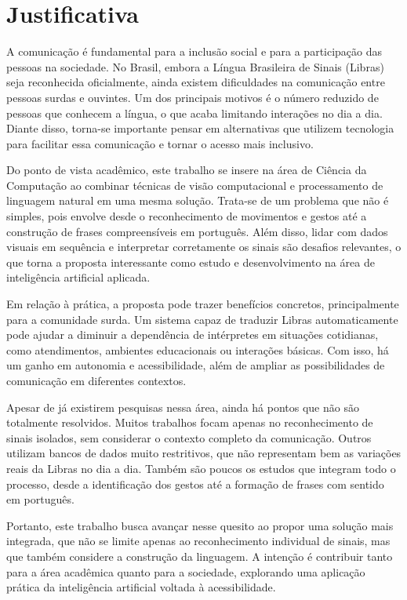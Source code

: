 \documentclass[
    12pt,                %
    openright,           %
    oneside,             %
    a4paper,             %
    english,             %
    brazil               %
]{abntex2}
\begin{document}
\section{Justificativa}
\label{sec:justificativa}

A comunicação é fundamental para a inclusão social e para a participação das pessoas na sociedade. No Brasil, embora a Língua Brasileira de Sinais (Libras) seja reconhecida oficialmente, ainda existem dificuldades na comunicação entre pessoas surdas e ouvintes. Um dos principais motivos é o número reduzido de pessoas que conhecem a língua, o que acaba limitando interações no dia a dia. Diante disso, torna-se importante pensar em alternativas que utilizem tecnologia para facilitar essa comunicação e tornar o acesso mais inclusivo.

Do ponto de vista acadêmico, este trabalho se insere na área de Ciência da Computação ao combinar técnicas de visão computacional e processamento de linguagem natural em uma mesma solução. Trata-se de um problema que não é simples, pois envolve desde o reconhecimento de movimentos e gestos até a construção de frases compreensíveis em português. Além disso, lidar com dados visuais em sequência e interpretar corretamente os sinais são desafios relevantes, o que torna a proposta interessante como estudo e desenvolvimento na área de inteligência artificial aplicada.

Em relação à prática, a proposta pode trazer benefícios concretos, principalmente para a comunidade surda. Um sistema capaz de traduzir Libras automaticamente pode ajudar a diminuir a dependência de intérpretes em situações cotidianas, como atendimentos, ambientes educacionais ou interações básicas. Com isso, há um ganho em autonomia e acessibilidade, além de ampliar as possibilidades de comunicação em diferentes contextos.

Apesar de já existirem pesquisas nessa área, ainda há pontos que não são totalmente resolvidos. Muitos trabalhos focam apenas no reconhecimento de sinais isolados, sem considerar o contexto completo da comunicação. Outros utilizam bancos de dados muito restritivos, que não representam bem as variações reais da Libras no dia a dia. Também são poucos os estudos que integram todo o processo, desde a identificação dos gestos até a formação de frases com sentido em português.

Portanto, este trabalho busca avançar nesse quesito ao propor uma solução mais integrada, que não se limite apenas ao reconhecimento individual de sinais, mas que também considere a construção da linguagem. A intenção é contribuir tanto para a área acadêmica quanto para a sociedade, explorando uma aplicação prática da inteligência artificial voltada à acessibilidade.
\end{document}

